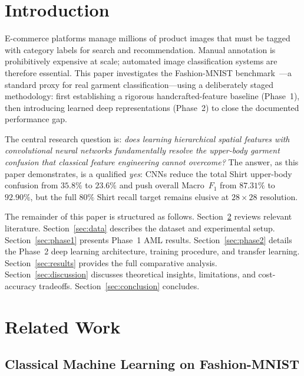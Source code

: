 \documentclass[conference]{IEEEtran}
\begin{document}
\section{Introduction}\label{sec:intro}

E-commerce platforms manage millions of product images that must be tagged
with category labels for search and recommendation. Manual annotation is
prohibitively expensive at scale; automated image classification systems
are therefore essential. This paper investigates the Fashion-MNIST
benchmark~\cite{xiao2017fashionmnist}---a standard proxy for real garment
classification---using a deliberately staged methodology: first
establishing a rigorous handcrafted-feature baseline (Phase~1), then
introducing learned deep representations (Phase~2) to close the documented
performance gap.

The central research question is: \emph{does learning hierarchical spatial
features with convolutional neural networks fundamentally resolve the
upper-body garment confusion that classical feature engineering cannot
overcome?} The answer, as this paper demonstrates, is a qualified
\emph{yes}: CNNs reduce the total Shirt upper-body confusion from $35.8\%$
to $23.6\%$ and push overall Macro~$F_1$ from $87.31\%$ to $92.90\%$,
but the full $80\%$ Shirt recall target remains elusive at $28\times28$
resolution.

The remainder of this paper is structured as follows. Section~\ref{sec:related}
reviews relevant literature. Section~\ref{sec:data} describes the dataset
and experimental setup. Section~\ref{sec:phase1} presents Phase~1 AML
results. Section~\ref{sec:phase2} details the Phase~2 deep learning
architecture, training procedure, and transfer learning. Section~\ref{sec:results}
provides the full comparative analysis. Section~\ref{sec:discussion}
discusses theoretical insights, limitations, and cost-accuracy tradeoffs.
Section~\ref{sec:conclusion} concludes.

\section{Related Work}\label{sec:related}

\subsection{Classical Machine Learning on Fashion-MNIST}
\end{document}
